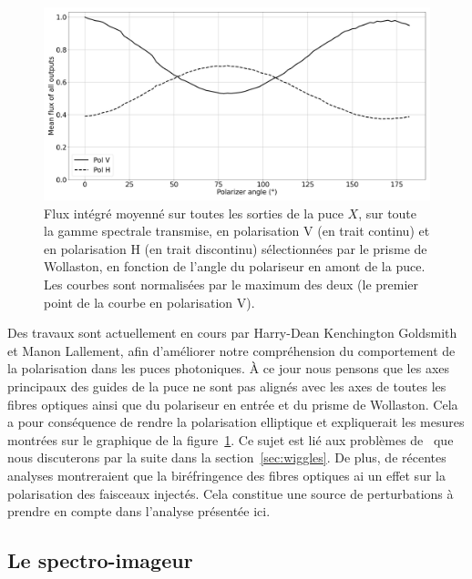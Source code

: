 \begin{figure}[ht!]
    \centering
    \includegraphics[width=\figwidth]{Figure_Chap2/20221019_5TC_PX_OutputFlux_Mean_VS_Angle.png}
    \caption[Flux intégré moyenné sur toutes les sorties de la puce $X$ en fonction de l'angle du polariseur, dans les deux polarisations.]{Flux intégré moyenné sur toutes les sorties de la puce $X$, sur toute la gamme spectrale transmise, en polarisation V (en trait continu) et en polarisation H (en trait discontinu) sélectionnées par le prisme de Wollaston, en fonction de l'angle du polariseur en amont de la puce. Les courbes sont normalisées par le maximum des deux (le premier point de la courbe en polarisation V).}
    \label{fig:PolaRotation}
\end{figure}

Des travaux sont actuellement en cours par Harry-Dean Kenchington Goldsmith et Manon Lallement, afin d'améliorer notre compréhension du comportement de la polarisation dans les puces photoniques. À ce jour nous pensons que les axes principaux des guides de la puce ne sont pas alignés avec les axes de toutes les fibres optiques ainsi que du polariseur en entrée et du prisme de Wollaston. Cela a pour conséquence de rendre la polarisation elliptique et expliquerait les mesures montrées sur le graphique de la figure~\ref{fig:PolaRotation}. Ce sujet est lié aux problèmes de \wiggles~que nous discuterons par la suite dans la section~\ref{sec:wiggles}. De plus, de récentes analyses montreraient que la biréfringence des fibres optiques ai un effet sur la polarisation des faisceaux injectés. Cela constitue une source de perturbations à prendre en compte dans l'analyse présentée ici.


\subsection{Le spectro-imageur}
\label{sec:InstruSpectro}

